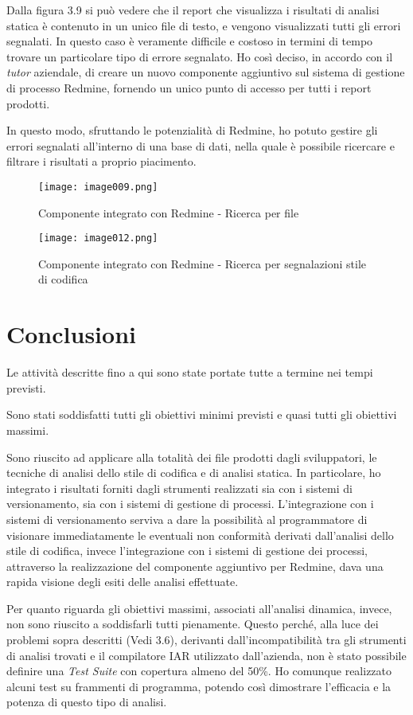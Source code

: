Dalla figura 3.9 si può vedere che il report che visualizza i risultati di analisi statica è contenuto in un unico file di testo, e vengono visualizzati tutti gli errori segnalati. In questo caso è veramente difficile e costoso in termini di tempo trovare un particolare tipo di errore segnalato. Ho così deciso, in accordo con il \textit{tutor} aziendale, di creare un nuovo componente aggiuntivo sul sistema di gestione di processo Redmine, fornendo un unico punto di accesso per tutti i report prodotti.

In questo modo, sfruttando le potenzialità di Redmine, ho potuto gestire gli errori segnalati all'interno di una base di dati, nella quale è possibile ricercare e filtrare i risultati a proprio piacimento.

\begin{figure}[H]
  \centering
  \texttt{[image: image009.png]}
  \caption{Componente integrato con Redmine - Ricerca per file}
\end{figure}

\begin{figure}[H]
  \centering
  \texttt{[image: image012.png]}
  \caption{Componente integrato con Redmine - Ricerca per segnalazioni stile di codifica}
\end{figure}

\section{Conclusioni}
Le attività descritte fino a qui sono state portate tutte a termine nei tempi previsti.

Sono stati soddisfatti tutti gli obiettivi minimi previsti e quasi tutti gli obiettivi massimi.

Sono riuscito ad applicare alla totalità dei file prodotti dagli sviluppatori, le tecniche di analisi dello stile di codifica e di analisi statica. In particolare, ho integrato i risultati forniti dagli strumenti realizzati sia con i sistemi di versionamento, sia con i sistemi di gestione di processi. L'integrazione con i sistemi di versionamento serviva a dare la possibilità
al programmatore di visionare immediatamente le eventuali non conformità derivati dall'analisi dello stile di codifica, invece l'integrazione con i sistemi di gestione dei processi, attraverso la realizzazione del componente aggiuntivo per Redmine, dava una rapida visione degli esiti delle analisi effettuate.

Per quanto riguarda gli obiettivi massimi, associati all'analisi dinamica, invece, non sono riuscito a soddisfarli tutti pienamente. Questo perché, alla luce dei problemi sopra descritti (Vedi 3.6), derivanti dall'incompatibilità tra gli strumenti di analisi trovati e il compilatore IAR utilizzato dall'azienda, non è stato possibile definire una \textit{Test Suite} con copertura almeno del 50\%. Ho comunque realizzato alcuni test su frammenti di programma, potendo così dimostrare l'efficacia e la potenza di questo tipo di analisi.


